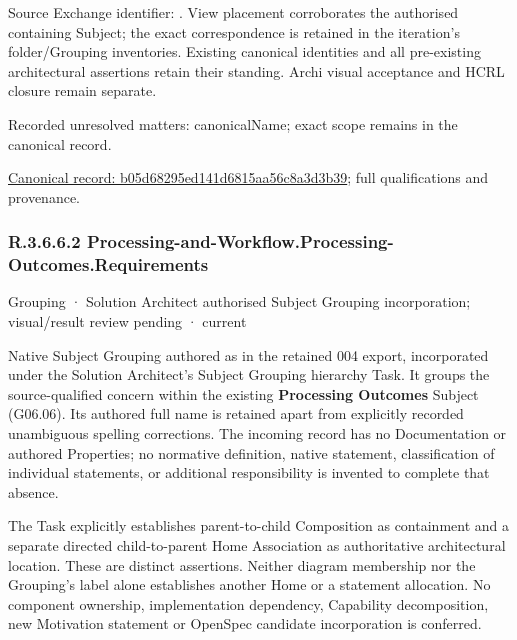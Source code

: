 Source Exchange identifier: \texttt{}. View placement corroborates
the authorised containing Subject; the exact correspondence is retained in the
iteration's folder/Grouping inventories. Existing canonical identities and all
pre-existing architectural assertions retain their standing. Archi visual
acceptance and HCRL closure remain separate.


{\small Recorded unresolved matters: canonicalName; exact scope remains in the canonical record.}\par
{\footnotesize \href{../../../../continuum/grouping/b05d68295ed141d6815aa56c8a3d3b39.md}{Canonical record: b05d68295ed141d6815aa56c8a3d3b39}; full qualifications and provenance.}\par
\subsubsection*{R.3.6.6.2 Processing-and-Workflow.Processing-Outcomes.Requirements}
\label{navigation:R.3.6.6.2}

\label{element:477d6408de0642fc875ce79d8e9dee86}
{\small Grouping · Solution Architect authorised Subject Grouping incorporation; visual/result review pending · current}\par

Native Subject Grouping authored as \texttt{} in the retained 004 export,
incorporated under the Solution Architect's Subject Grouping hierarchy Task.
It groups the source-qualified \texttt{} concern within
the existing \textbf{Processing Outcomes} Subject (G06.06). Its authored full name
is retained apart from explicitly recorded unambiguous spelling corrections.
The incoming record has no Documentation or authored Properties; no normative
definition, native statement, classification of individual statements, or
additional responsibility is invented to complete that absence.



The Task explicitly establishes parent-to-child Composition as containment and
a separate directed child-to-parent Home Association as authoritative architectural
location. These are distinct assertions. Neither diagram membership nor the
Grouping's label alone establishes another Home or a statement allocation.
No component ownership, implementation dependency, Capability decomposition,
new Motivation statement or OpenSpec candidate incorporation is conferred.



